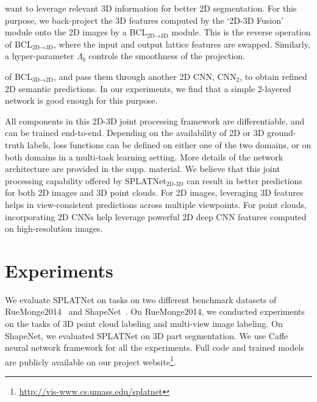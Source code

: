 \documentclass[10pt,twocolumn,letterpaper]{article}
\def\model{SPLATNet\xspace}
\begin{document}
want to leverage relevant 3D information for better 2D segmentation. For this purpose, we back-project
the 3D features computed by the `2D-3D Fusion' module onto the 2D images by a BCL$_{\text{2D}\rightarrow\text{3D}}$ module. This is the reverse operation of BCL$_{\text{2D}\rightarrow\text{3D}}$, where the
input and output lattice features are swapped. Similarly, a hyper-parameter $\Lambda_b$ controls the smoothness of the projection.

of BCL$_{\text{3D}\rightarrow\text{2D}}$, and pass them through another 2D CNN, CNN$_2$, to obtain refined
2D semantic predictions. In our experiments, we find that a simple 2-layered network is good enough
for this purpose.


All components in this 2D-3D joint processing framework are differentiable, and can be trained end-to-end. Depending on the availability of 2D or 3D ground-truth labels, loss functions can be defined on either one of the two domains, or on both domains in a multi-task learning setting. More details of the network architecture
are provided in the supp. material. We believe that this joint processing capability offered by SPLATNet$_{\text{2D-3D}}$ can result in better predictions for both 2D images and 3D point clouds. For 2D images, leveraging 3D features helps in view-consistent predictions across multiple viewpoints. 
For point clouds, incorporating 2D CNNs help leverage powerful 2D deep CNN features computed on high-resolution images.


\section{Experiments}\label{sec:exp}

We evaluate \model on tasks on two different benchmark datasets of
RueMonge2014~\cite{riemenschneider2014learning} and ShapeNet~\cite{yi2016scalable}.
On RueMonge2014, we conducted experiments on the tasks of 3D point cloud labeling
and multi-view image labeling. On ShapeNet, we evaluated \model on 3D part segmentation. We use Caffe~\cite{jia2014caffe} neural network framework for all the experiments.
Full code and trained models are publicly available on our project website\footnote{\url{http://vis-www.cs.umass.edu/splatnet}}.
\end{document}
